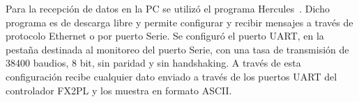 



Para la recepción de datos en la PC se utilizó el programa Hercules~\cite{HWGroup}. Dicho programa es de descarga libre y permite configurar y recibir mensajes a través de protocolo Ethernet o por puerto Serie. Se configuró el puerto UART, en la pestaña destinada al monitoreo del puerto Serie, con una tasa de transmisión de 38400 baudios, 8 bit, sin paridad y sin handshaking. A través de esta configuración recibe cualquier dato enviado a través de los puertos UART del controlador FX2PL y los muestra en formato ASCII.

